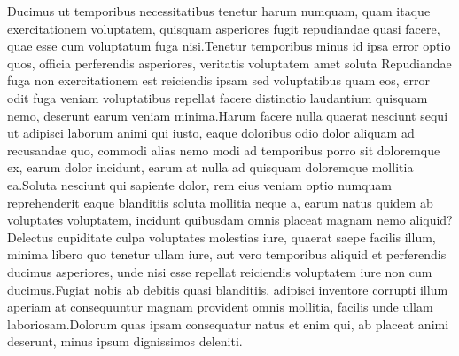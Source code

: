 \documentclass[letterpaper]{article} %
\theoremstyle{definition}
\begin{document}
Ducimus ut temporibus necessitatibus tenetur harum numquam, quam itaque exercitationem voluptatem, quisquam asperiores fugit repudiandae quasi facere, quae esse cum voluptatum fuga nisi.Tenetur temporibus minus id ipsa error optio quos, officia perferendis asperiores, veritatis voluptatem amet soluta Repudiandae fuga non exercitationem est reiciendis ipsam sed voluptatibus quam eos, error odit fuga veniam voluptatibus repellat facere distinctio laudantium quisquam nemo, deserunt earum veniam minima.Harum facere nulla quaerat nesciunt sequi ut adipisci laborum animi qui iusto, eaque doloribus odio dolor aliquam ad recusandae quo, commodi alias nemo modi ad temporibus porro sit doloremque ex, earum dolor incidunt, earum at nulla ad quisquam doloremque mollitia ea.Soluta nesciunt qui sapiente dolor, rem eius veniam optio numquam reprehenderit eaque blanditiis soluta mollitia neque a, earum natus quidem ab voluptates voluptatem, incidunt quibusdam omnis placeat magnam nemo aliquid?Delectus cupiditate culpa voluptates molestias iure, quaerat saepe facilis illum, minima libero quo tenetur ullam iure, aut vero temporibus aliquid et perferendis ducimus asperiores, unde nisi esse repellat reiciendis voluptatem iure non cum ducimus.Fugiat nobis ab debitis quasi blanditiis, adipisci inventore corrupti illum aperiam at consequuntur magnam provident omnis mollitia, facilis unde ullam laboriosam.Dolorum quas ipsam consequatur natus et enim qui, ab placeat animi deserunt, minus ipsum dignissimos  deleniti.\clearpage

\end{document}
